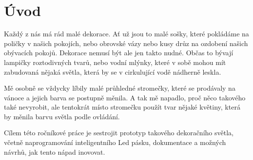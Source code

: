 \chapter*{Úvod}

Každý z nás má rád malé dekorace. Ať už jsou to malé sošky, které pokládáme na poličky v našich pokojích, nebo obrovské vázy nebo kusy drůz na ozdobení našich obývacích pokojů. Dekorace nemusí být ale jen takto nudné. Občas to bývají lampičky roztodivných tvarů, nebo vodní mlýnky, které v sobě mohou mít zabudovaná nějaká světla, která by se v cirkulující vodě \cite{schommers} nádherně leskla.

Mě osobně se vždycky líbily malé průhledné stromečky, které se prodávaly na vánoce a jejich barva se postupně měnila. A tak mě napadlo, proč něco takového také nevyrobit, ale tentokrát místo stromečku použít tvar nějaké květiny, která by měnila barvu světla podle ovládání. %

Cílem této ročníkové práce je sestrojit prototyp takového dekoračního světla, včetně naprogramování inteligentního Led pásku, dokumentace a možných návrhů, jak tento nápad inovovat.

